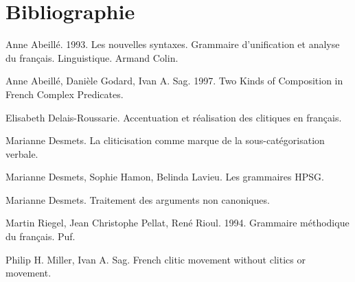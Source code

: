 \section{Bibliographie}

﻿Anne Abeillé. 1993. Les nouvelles syntaxes. Grammaire d'unification et analyse du français. Linguistique. Armand Colin.

Anne Abeillé, Danièle Godard, Ivan A. Sag. 1997. Two Kinds of Composition in French Complex Predicates.

Elisabeth Delais-Roussarie. Accentuation et réalisation des clitiques en français.

Marianne Desmets. La cliticisation comme marque de la sous-catégorisation verbale.

Marianne Desmets, Sophie Hamon, Belinda Lavieu. Les grammaires HPSG.

Marianne Desmets. Traitement des arguments non canoniques.

Martin Riegel, Jean Christophe Pellat, René Rioul. 1994. Grammaire méthodique du français. Puf.

Philip H. Miller, Ivan A. Sag. French clitic movement without clitics or movement.
